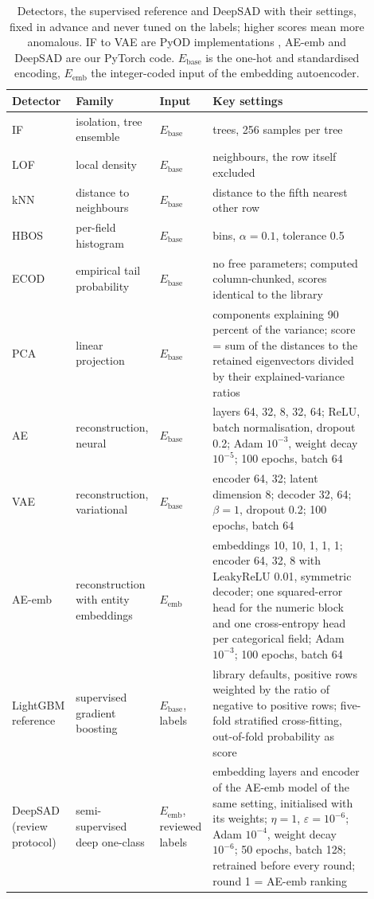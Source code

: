 \begin{table}[tbp]
\caption{Detectors, the supervised reference and DeepSAD with their settings, fixed in advance and never tuned on the labels; higher scores mean more anomalous. IF to VAE are PyOD implementations \citep{zhao2019pyod}, AE-emb and DeepSAD are our PyTorch code. $E_{\mathrm{base}}$ is the one-hot and standardised encoding, $E_{\mathrm{emb}}$ the integer-coded input of the embedding autoencoder.}
\label{tab:detectors}
\centering
\footnotesize
\begin{tabular}{@{}>{\raggedright\arraybackslash}p{0.12\linewidth}>{\raggedright\arraybackslash}p{0.2\linewidth}>{\raggedright\arraybackslash}p{0.1\linewidth}>{\raggedright\arraybackslash}p{0.48\linewidth}@{}}
\toprule
Detector & Family & Input & Key settings \\
\midrule
IF & isolation, tree ensemble & $E_{\mathrm{base}}$ & 200 trees, 256 samples per tree \\
LOF & local density & $E_{\mathrm{base}}$ & 20 neighbours, the row itself excluded \\
kNN & distance to neighbours & $E_{\mathrm{base}}$ & distance to the fifth nearest other row \\
HBOS & per-field histogram & $E_{\mathrm{base}}$ & 10 bins, $\alpha = 0.1$, tolerance 0.5 \\
ECOD & empirical tail probability & $E_{\mathrm{base}}$ & no free parameters; computed column-chunked, scores identical to the library \\
PCA & linear projection & $E_{\mathrm{base}}$ & components explaining 90 percent of the variance; score = sum of the distances to the retained eigenvectors divided by their explained-variance ratios \\
AE & reconstruction, neural & $E_{\mathrm{base}}$ & layers 64, 32, 8, 32, 64; ReLU, batch normalisation, dropout 0.2; Adam $10^{-3}$, weight decay $10^{-5}$; 100 epochs, batch 64 \\
VAE & reconstruction, variational & $E_{\mathrm{base}}$ & encoder 64, 32; latent dimension 8; decoder 32, 64; $\beta = 1$, dropout 0.2; 100 epochs, batch 64 \\
AE-emb & reconstruction with entity embeddings & $E_{\mathrm{emb}}$ & embeddings 10, 10, 1, 1, 1; encoder 64, 32, 8 with LeakyReLU 0.01, symmetric decoder; one squared-error head for the numeric block and one cross-entropy head per categorical field; Adam $10^{-3}$; 100 epochs, batch 64 \\
\midrule
LightGBM reference & supervised gradient boosting & $E_{\mathrm{base}}$, labels & library defaults, positive rows weighted by the ratio of negative to positive rows; five-fold stratified cross-fitting, out-of-fold probability as score \\
\midrule
DeepSAD (review protocol) & semi-supervised deep one-class & $E_{\mathrm{emb}}$, reviewed labels & embedding layers and encoder of the AE-emb model of the same setting, initialised with its weights; $\eta = 1$, $\varepsilon = 10^{-6}$; Adam $10^{-4}$, weight decay $10^{-6}$; 50 epochs, batch 128; retrained before every round; round 1 = AE-emb ranking \\
\bottomrule
\end{tabular}
\end{table}
